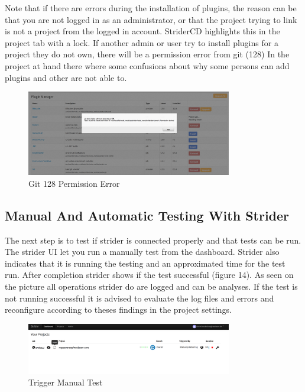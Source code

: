 Note that if there are errors during the installation of plugins, the reason can be that you are not logged in as an administrator,
or that the project trying to link is not a project from the logged in account. StriderCD highlights this in the project tab with a lock.
If another admin or user try to install plugins for a project they do not own, there will be a permission error from git (128)
In the project at hand there where some confusions about why some persons can add plugins and other are not able to.

\begin{figure}[h!]
  \centering
  \includegraphics[width=0.8\textwidth]{images/permissionError.png}
  \caption{Git 128 Permission Error}
\end{figure}

\subsection{Manual And Automatic Testing With Strider}
\label{Manual And Automatic Testing With Strider}
The next step is to test if strider is connected properly and that tests can be run. The strider UI let you run a manually test from
the dashboard. Strider also indicates that it is running the testing and an approximated time for the test run. After completion
strider shows if the test successful (figure 14). As seen on the picture all operations strider do are logged and can be
analyses. If the test is not running successful it is advised to evaluate the log files and errors and reconfigure according to theses
findings in the project settings.

\begin{figure}[h!]
  \centering
  \includegraphics[width=0.8\textwidth]{images/manualTest.png}
  \caption{Trigger Manual Test}
\end{figure}

